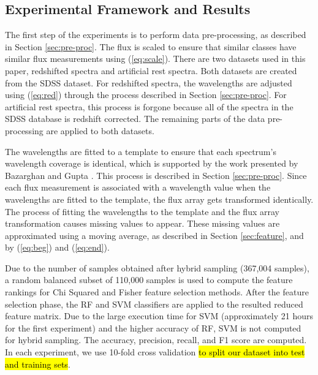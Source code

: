 \documentclass[conference]{IEEEtran}
\DeclareRobustCommand{\hlorange}[1]{{\sethlcolor{orange}\hl{#1}}}
\begin{document}
	\subsection{Experimental Framework and Results}\label{sec:results}

    	The first step of the experiments is to perform data pre-processing, as described in Section \ref{sec:pre-proc}. The flux is scaled to ensure that similar classes have similar flux measurements using (\ref{eq:scale}). There are two datasets used in this paper, redshifted spectra and artificial rest spectra. Both datasets are created from the SDSS dataset. For redshifted spectra, the wavelengths are adjusted using (\ref{eq:red}) through the process described in Section \ref{sec:pre-proc}. For artificial rest spectra, this process is forgone because all of the spectra in the SDSS database is redshift corrected. The remaining parts of the data pre-processing are applied to both datasets.

	The wavelengths are fitted to a template to ensure that each spectrum's wavelength coverage is identical, which is supported by the work presented by Bazarghan and Gupta \cite{Bazarghan}. This process is described in Section \ref{sec:pre-proc}. Since each flux measurement is associated with a wavelength value when the wavelengths are fitted to the template, the flux array gets transformed identically. The process of fitting the wavelengths to the template and the flux array transformation causes missing values to appear. These missing values are approximated using a moving average, as described in Section \ref{sec:feature}, and by (\ref{eq:beg}) and (\ref{eq:end}).


Due to the number of samples obtained after hybrid sampling (367,004 samples), a random balanced subset of 110,000 samples is used to compute the feature rankings for Chi Squared and Fisher feature selection methods. After the feature selection phase, the RF and SVM classifiers are applied to the resulted reduced feature matrix. Due to the large execution time for SVM (approximately 21 hours for the first experiment) and the higher accuracy of RF, SVM is not computed for hybrid sampling. The accuracy, precision, recall, and F1 score are computed. In each experiment, we use 10-fold cross validation \hlorange{to split our dataset into test and training sets}. 
\end{document}
